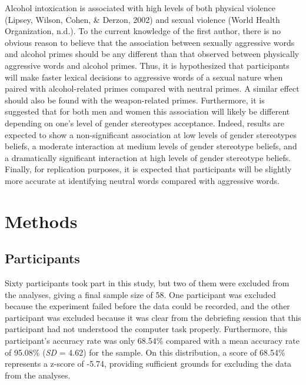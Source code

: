 \documentclass[authordate, serif, review]{jote-article}
\begin{document}
\begin{multicols}{2}
Alcohol intoxication is associated with high levels of both physical violence (Lipsey, Wilson, Cohen, \& Derzon, 2002) and sexual violence (World Health Organization, n.d.). To the current knowledge of the first author, there is no obvious reason to believe that the association between sexually aggressive words and alcohol primes should be any different than that observed between physically aggressive words and alcohol primes. Thus, it is hypothesized that participants will make faster lexical decisions to aggressive words of a sexual nature when paired with alcohol-related primes compared with neutral primes. A similar effect should also be found with the weapon-related primes. Furthermore, it is suggested that for both men and women this association will likely be different depending on one's level of gender stereotypes acceptance. Indeed, results are expected to show a non-significant association at low levels of gender stereotypes beliefs, a moderate interaction at medium levels of gender stereotype beliefs, and a dramatically significant interaction at high levels of gender stereotype beliefs. Finally, for replication purposes, it is expected that participants will be slightly more accurate at identifying neutral words compared with aggressive words. 

\label{sec:methods}
{}
\section*{Methods} \gotoreview
{}
{}
\subsection*{Participants}
Sixty participants took part in this study, but two of them were excluded from the analyses, giving a final sample size of 58. One participant was excluded because the experiment failed before the data could be recorded, and the other participant was excluded because it was clear from the debriefing session that this participant had not understood the computer task properly. Furthermore, this participant's accuracy rate was only 68.54\% compared with a mean accuracy rate of 95.08\% (\textit{SD }= 4.62) for the sample. On this distribution, a score of 68.54\% represents a z-score of -5.74, providing sufficient grounds for excluding the data from the analyses. 


\end{multicols}
\end{document}
